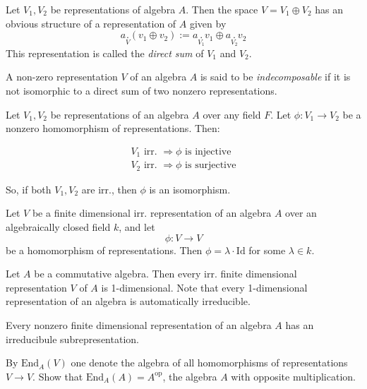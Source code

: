 \begin{defn}
Let \(V_{1},V_{2}\) be representations of algebra \(A\). Then the space \(V=V_{1}\oplus V_{2}\) has an obvious structure of a representation of \(A\) given by
$$a\underset{V}{.}(v_{1}\oplus v_{2}):=a\underset{V_{1}}{.}v_{1}\oplus a\underset{V_{2}}{.}v_{2}$$
This representation is called the \emph{direct sum} of \(V_{1}\) and \(V_{2}\).
\end{defn}

\begin{defn}
A non-zero representation \(V\) of an algebra \(A\) is said to be \emph{indecomposable} if it is not isomorphic to a direct sum of two nonzero representations.
\end{defn}

\begin{thm}
 Let \(V_{1},V_{2}\) be representations of an algebra \(A\) over any field \(F\). Let \(\phi :V_{1}\rightarrow V_{2}\) be a nonzero homomorphism of representations. Then:   

\begin{gather*}V_{1} \text{ irr. } \Longrightarrow  \phi  \text{ is injective} \\
 V_{2} \text{ irr. } \Longrightarrow  \phi  \text{ is surjective}\end{gather*}

So, if both \(V_{1},V_{2}\) are irr., then \(\phi \) is an isomorphism.
\end{thm}

\begin{thm}
Let \(V\) be a finite dimensional irr. representation of an algebra \(A\) over an algebraically closed field \(k\), and let 
$$\phi :V\rightarrow V$$
be a homomorphism of representations. Then \(\phi =\lambda \cdot \text{Id}\) for some \(\lambda \in k\).
\end{thm}

\begin{thm}
Let \(A\) be a commutative algebra. Then every irr. finite dimensional representation \(V\) of \(A\) is 1-dimensional. Note that every 1-dimensional representation of an algebra is automatically irreducible.
\end{thm}

\begin{thm}
Every nonzero finite dimensional representation of an algebra \(A\) has an irreducibule subrepresentation.
\end{thm}

\begin{thm}
By \(\text{End}_{A} (V)\) one denote the algebra of all homomorphisms of representations \(V\rightarrow V\). Show that \(\text{End}_{A} (A)=A^{\text{op}}\), the algebra \(A\) with opposite multiplication.
\end{thm}


